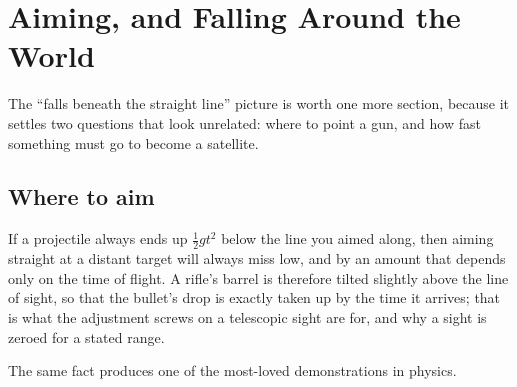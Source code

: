 \documentclass[11pt,twoside,openany]{book}
\begin{document}
\section{Aiming, and Falling Around the World}
\label{sec:orbit}

The ``falls beneath the straight line'' picture is worth one more section, because it settles two questions that look unrelated: where to point a gun, and how fast something must go to become a satellite.

\subsection{Where to aim}

If a projectile always ends up $\tfrac12 g t^2$ below the line you aimed along, then aiming straight at a distant target will always miss low, and by an amount that depends only on the time of flight. A rifle's barrel is therefore tilted slightly above the line of sight, so that the bullet's drop is exactly taken up by the time it arrives; that is what the adjustment screws on a telescopic sight are for, and why a sight is zeroed for a stated range.

The same fact produces one of the most-loved demonstrations in physics.
\end{document}
